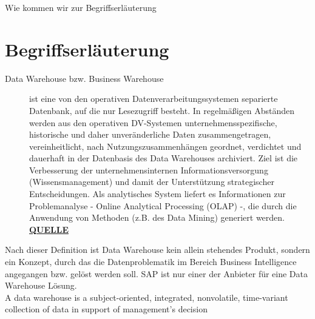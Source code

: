 Wie kommen wir zur Begriffserläuterung
\section{Begriffserläuterung}
\begin{description}
	\item [Data Warehouse bzw. Business Warehouse] ist eine von den operativen Datenverarbeitungssystemen separierte Datenbank, auf die nur Lesezugriff besteht. In regelmäßigen Abständen werden aus den operativen DV-Systemen unternehmensspezifische, historische und daher unveränderliche Daten zusammengetragen, vereinheitlicht, nach Nutzungszusammenhängen geordnet, verdichtet und dauerhaft in der Datenbasis des Data Warehouses archiviert. Ziel ist die Verbesserung der unternehmensinternen Informationsversorgung (Wissensmanagement) und damit der Unterstützung strategischer Entscheidungen. Als analytisches System liefert es Informationen zur Problemanalyse - Online Analytical Processing (OLAP) -, die durch die Anwendung von Methoden (z.B. des Data Mining) generiert werden.  \href{http://wirtschaftslexikon.gabler.de/Definition/data-warehouse.html?referenceKeywordName=Business+Warehouse}{\textbf{QUELLE}}
\end{description}

Nach dieser Definition ist Data Warehouse kein allein stehendes Produkt, sondern ein Konzept, durch das die Datenproblematik im Bereich Business Intelligence  angegangen bzw. gelöst werden soll. SAP ist nur einer der Anbieter für eine Data Warehouse Lösung. \\


A data warehouse is a subject-oriented, integrated, nonvolatile, time-variant collection of data in support of management’s decision \\

